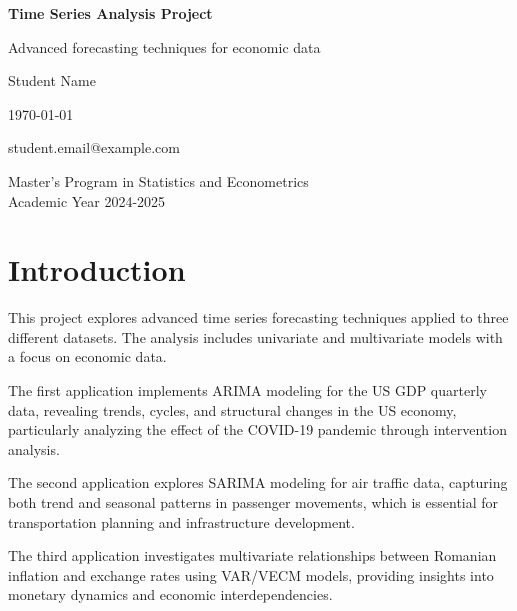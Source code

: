 \documentclass[11pt,a4paper]{article}
\begin{document}
\begin{titlepage}
    \begin{center}
        \vspace*{1cm}

        \Huge
        \textbf{Time Series Analysis Project}

        \vspace{0.5cm}
        \LARGE
        Advanced forecasting techniques for economic data

        \vspace{1.5cm}

        \Large
        Student Name

        \vspace{1.5cm}

        \Large
        \today

        \vspace{1.5cm}

        \normalsize
        student.email@example.com

        \vfill

        \Large
        Master's Program in Statistics and Econometrics\\
        Academic Year 2024-2025
    \end{center}
\end{titlepage}

\tableofcontents
\newpage

\section{Introduction}

This project explores advanced time series forecasting techniques applied to three different datasets. The analysis includes univariate and multivariate models with a focus on economic data.

The first application implements ARIMA modeling for the US GDP quarterly data, revealing trends, cycles, and structural changes in the US economy, particularly analyzing the effect of the COVID-19 pandemic through intervention analysis.

The second application explores SARIMA modeling for air traffic data, capturing both trend and seasonal patterns in passenger movements, which is essential for transportation planning and infrastructure development.

The third application investigates multivariate relationships between Romanian inflation and exchange rates using VAR/VECM models, providing insights into monetary dynamics and economic interdependencies.
\end{document}
